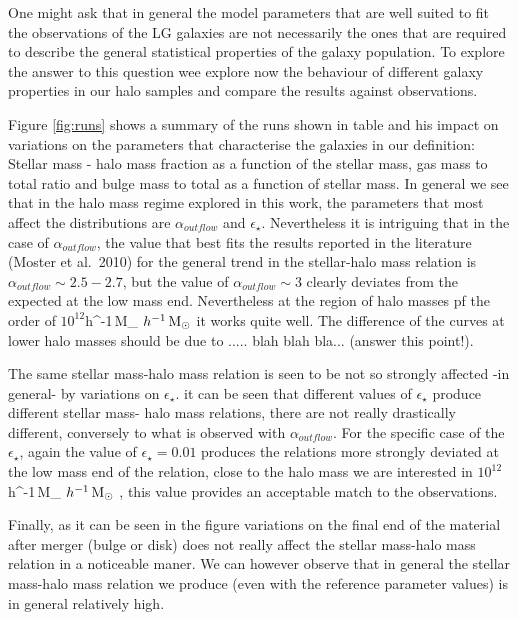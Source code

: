 \documentclass[useAMS,usenatbib]{mn2e}
\newcommand{\etal}{et al.~}
\def \hMsun {\ifmmode h^{-1}\,\rm M_{\odot} \else $h^{-1}\,\rm M_{\odot}$ \fi}
\begin{document}
One might ask that in general the model parameters that are well
suited to fit the observations of the LG galaxies are not necessarily
the ones that are required to describe the general statistical
properties of the galaxy population. To explore the answer to this
question wee explore now the behaviour of different galaxy properties
in our halo samples and compare the results against observations.

Figure \ref{fig:runs} shows a summary of the runs shown in
table \label{tab:runs} and his impact on variations on the parameters
that characterise the galaxies in our definition: Stellar mass - halo
mass fraction as a function of the stellar mass, gas mass to total
ratio and bulge mass to total as a function of stellar mass. In
general we see that in the halo mass regime explored in this work, the
parameters that most affect the distributions are $\alpha_{outflow}$
and $\epsilon_{\star}$. Nevertheless it is intriguing that in the case
of $\alpha_{outflow}$, the value that best fits the results reported
in the literature (Moster \etal 2010) for the general trend in the
stellar-halo mass relation is $\alpha_{outflow} \sim 2.5-2.7$, but the
value of $\alpha_{outflow} \sim 3$ clearly deviates from the expected
at the low mass end. Nevertheless at the region of halo masses pf the
order of $10^{12}$\hMsun it works quite well. The difference of the
curves at lower halo masses should be due to ..... blah blah
bla... (answer this point!).

The same stellar mass-halo mass relation is seen to be not so strongly
affected -in general- by variations on $\epsilon_{\star}$.  it
can be seen that different values of $\epsilon_{\star}$ produce
different stellar mass- halo mass relations, there are not really
drastically different, conversely to what is observed with
$\alpha_{outflow}$. For the specific case of the $\epsilon_{\star}$,
again the value of $\epsilon_{\star}=0.01$ produces the relations more
strongly deviated at the low mass end of the relation, close to the
halo mass we are interested in $10^{12}$\hMsun, this value provides
an acceptable match to the observations.

Finally, as it can be seen in the figure variations on the final end
of the material after merger (bulge or disk) does not really affect
the stellar mass-halo mass relation in a noticeable maner. We can
however observe that in general the stellar mass-halo mass relation we
produce (even with the reference parameter values) is in general
relatively high.
\end{document}
